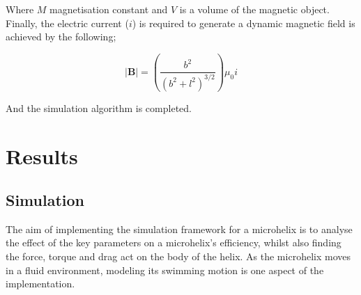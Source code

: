 \documentclass[12pt,a4paper,titlepage]{report}
\begin{document}
Where $M$ magnetisation constant and $V$ is a volume of the magnetic object. Finally, the electric current 
($i$) is required to generate a dynamic magnetic field is achieved by the following; 


\begin{equation}
|\bm{B}| = (\frac{b^2}{(b^2+l^2)^{3/2}}){\mu}_0 i
\label{Current}  
\end{equation}


And the simulation algorithm is completed.

\chapter{Results}\label{result}

\section{Simulation}
The aim of implementing the simulation framework for a microhelix is to analyse the effect of 
the key parameters on a microhelix\rq{}s efficiency, whilst also finding the force, torque and drag act on 
the body of the helix. As the microhelix moves in a fluid environment, modeling its swimming
motion is one aspect of the implementation. 
\end{document}
